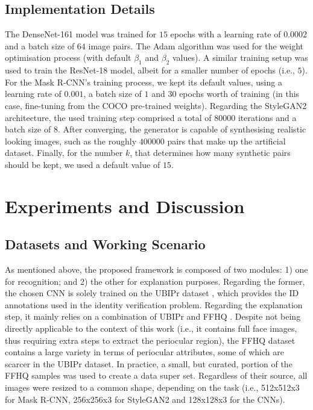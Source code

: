 \documentclass[final]{cvpr}
\begin{document}
\subsection{Implementation Details}
\label{subsec:implementation_details}
The DenseNet-161 model was trained for $15$ epochs with a learning rate of $0.0002$ and a batch size of $64$ image pairs. The Adam algorithm was used for the weight optimisation process (with default $\beta_1$ and $\beta_2$ values). A similar training setup was used to train the ResNet-18 model, albeit for a smaller number of epochs (i.e., $5$).
For the Mask R-CNN's training process, we kept its default values, using a learning rate of $0.001$, a batch size of $1$ and $30$ epochs worth of training (in this case, fine-tuning from the COCO pre-trained weights).
Regarding the StyleGAN2 architecture, the used training step comprised a total of $80000$ iterations and a batch size of $8$. After converging, the generator is capable of synthesising realistic looking images, such as the roughly $400000$ pairs that make up the artificial dataset. Finally, for the number $k$, that determines how many synthetic pairs should be kept, we used a default value of $15$.



\section{Experiments and Discussion}
\label{sec:experiments_and_discussion}

\subsection{Datasets and Working Scenario}
\label{subsec:datasets}
As mentioned above, the proposed framework is composed of two modules: 1) one for recognition; and 2) the other for explanation purposes. Regarding the former, the chosen CNN is solely trained on the UBIPr dataset \cite{ubipr}, which provides the ID annotations used in the identity verification problem. Regarding the explanation step, it mainly relies on a combination of UBIPr and FFHQ \cite{stylegan}. Despite not being directly applicable to the context of this work (i.e., it contains full face images, thus requiring extra steps to extract the periocular region), the FFHQ dataset contains a large variety in terms of periocular attributes, some of which are scarcer in the UBIPr dataset. In practice, a small, but curated, portion of the FFHQ samples was used to create a data super set. Regardless of their source, all images were resized to a common shape, depending on the task (i.e., 512x512x3 for Mask R-CNN, 256x256x3 for StyleGAN2 and 128x128x3 for the CNNs).
\end{document}
